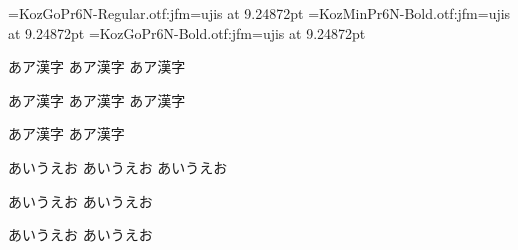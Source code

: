 \documentclass{ltjsarticle}
\begin{document}
\jfont\jaA=KozGoPr6N-Regular.otf:jfm=ujis at 9.24872pt
\jfont\jaB=KozMinPr6N-Bold.otf:jfm=ujis   at 9.24872pt
\jfont\jaC=KozGoPr6N-Bold.otf:jfm=ujis    at 9.24872pt

\jaA 
あア漢字%
\ltjdeclarealtfont\jaA{}
あア漢字%
\ltjdeclarealtfont\jaA{}
あア漢字%

\ltjdeclarealtfont\jaA{}
\ltjdeclarealtfont\jaA{}
あア漢字%
\mc
あア漢字%
\jaA 
あア漢字%

\jaA 
あア漢字%
\ltjclearaltfont\jaA
あア漢字%


\mc
あいうえお%
\selectfont あいうえお%
{\Large  あいうえお}

{%
}%
\selectfont あいうえお%
{\Large  あいうえお}

{\Large  あいうえお}%
あいうえお%
\end{document}

